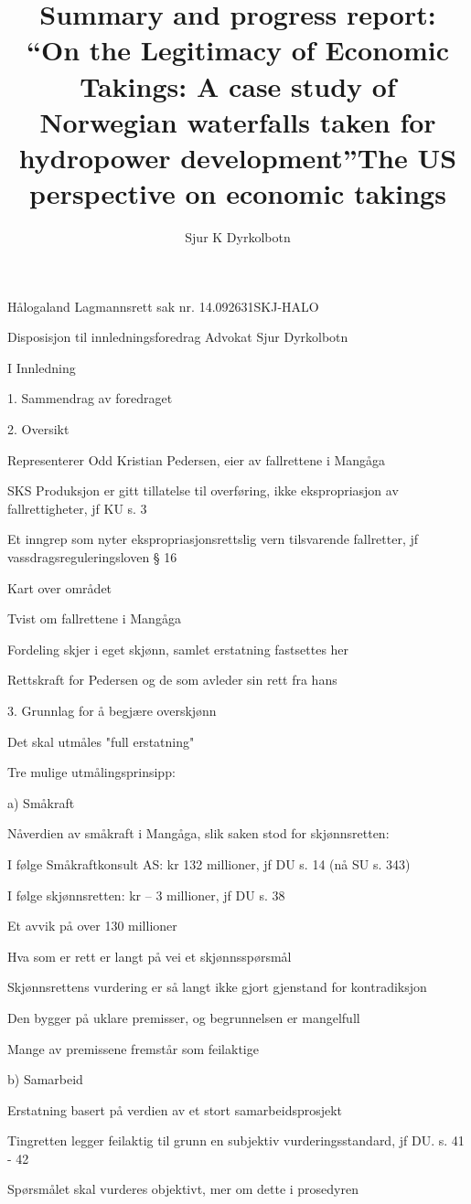 \documentclass[12pt,a4paper]{article} %
\title{{\huge Summary and progress report:} \\ ``On the Legitimacy of Economic Takings: A case study of Norwegian waterfalls taken for hydropower development''}
\author{Sjur K Dyrkolbotn}
\date{} %
\begin{document}
\title{The US perspective on economic takings}

Hålogaland Lagmannsrett sak nr. 14.092631SKJ-HALO

Disposisjon til innledningsforedrag
Advokat Sjur Dyrkolbotn

I	Innledning

1.	Sammendrag av foredraget

2.	Oversikt

	Representerer Odd Kristian Pedersen, eier av fallrettene i Mangåga

	SKS Produksjon er gitt tillatelse til overføring, ikke ekspropriasjon av fallrettigheter, jf KU s. 3

	Et inngrep som nyter ekspropriasjonsrettslig vern tilsvarende fallretter, jf vassdragsreguleringsloven § 16

	Kart over området
	
	Tvist om fallrettene i Mangåga
	
	Fordeling skjer i eget skjønn, samlet erstatning fastsettes her

	Rettskraft for Pedersen og de som avleder sin rett fra hans

3.	Grunnlag for å begjære overskjønn 

	Det skal utmåles "full erstatning"

	Tre mulige utmålingsprinsipp:

a)	Småkraft

	Nåverdien av småkraft i Mangåga, slik saken stod for skjønnsretten: 

	I følge Småkraftkonsult AS: 		kr 132 millioner, jf DU s. 14 (nå SU s. 343)
	
	I følge skjønnsretten: 			kr – 3 millioner, jf DU s. 38

	Et avvik på over 130 millioner

	Hva som er rett er langt på vei et skjønnsspørsmål

	Skjønnsrettens vurdering er så langt ikke gjort gjenstand for kontradiksjon

	Den bygger på uklare premisser, og begrunnelsen er mangelfull

	Mange av premissene fremstår som feilaktige

b)	Samarbeid

	Erstatning basert på verdien av et stort samarbeidsprosjekt
	
	Tingretten legger feilaktig til grunn en subjektiv vurderingsstandard, jf DU. s. 41 - 42

	Spørsmålet skal vurderes objektivt, mer om dette i prosedyren
\end{document}
